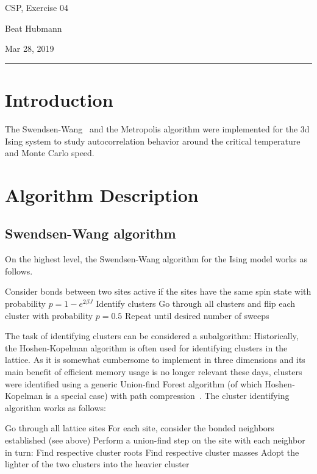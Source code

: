 \documentclass[11pt,a4paper]{article}
\begin{document}
\noindent\parbox{\linewidth}{
 \parbox{.25\linewidth}{ \large CSP, Exercise 04 }\hfill
 \parbox{.5\linewidth}{\begin{center} \large Beat Hubmann \end{center}}\hfill
 \parbox{.2\linewidth}{\begin{flushright} \large Mar 28, 2019 \end{flushright}}
}
\noindent\rule{\linewidth}{2pt}


\section{Introduction}

The Swendsen-Wang~\cite{swendsen} and the Metropolis algorithm were implemented
for the 3d Ising system to study autocorrelation behavior around the critical 
temperature and Monte Carlo speed.

\section{Algorithm Description}
\subsection{Swendsen-Wang algorithm}

On the highest level, the Swendsen-Wang algorithm for the Ising model works as follows.
\begin{outline}
	\1 Consider bonds between two sites active
		\2 if the sites have the same spin state
		\2 with probability $p=1-e^{2\beta J}$
	\1 Identify clusters
	\1 Go through all clusters and flip each cluster with probability $p=0.5$
	\1 Repeat until desired number of sweeps
\end{outline}

The task of identifying clusters can be considered a subalgorithm: Historically,
the Hoshen-Kopelman algorithm is often used for identifying clusters in the lattice.
As it is somewhat cumbersome to implement in three dimensions and its main benefit
of efficient memory usage is no longer relevant these days, clusters were identified
using a generic Union-find Forest algorithm (of which Hoshen-Kopelman is a special case)
with path compression~\cite{galler}.
The cluster identifying algorithm works as follows:
\begin{outline}
	\1 Go through all lattice sites
	\1 For each site, consider the bonded neighbors established (see above)
	\1 Perform a union-find step on the site with each neighbor in turn:
		\2 Find respective cluster roots
		\2 Find respective cluster masses
		\2 Adopt the lighter of the two clusters into the heavier cluster
\end{outline}
\end{document}
